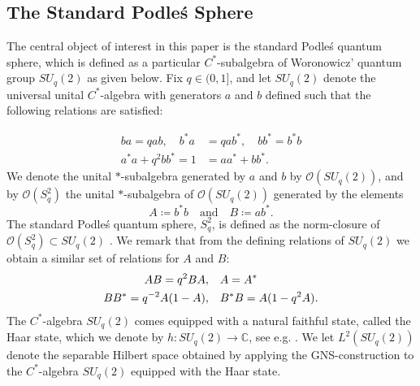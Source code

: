 \documentclass[11pt, reqno, a4paper, final]{amsart}
\theoremstyle{plain}
\theoremstyle{definition}
\newcommand{\ZZ}{{\mathbb Z}}
\newcommand{\CC}{{\mathbb C}}
\newcommand{\black}{\color{black}}
\begin{document}
\subsection{The Standard Podle\'s Sphere}
The central object of interest in this paper is the standard Podle\'s quantum sphere, which is defined as a particular $C^*$-subalgebra of Woronowicz' \cite{Woronowicz-SU2} quantum group $SU_q(2)$ as given below.
Fix {\black $q\in(0,1]$}, and let $SU_q(2)$ denote the universal unital $C^*$-algebra with generators $a$ and $b$ defined such that the following relations are satisfied:

\begin{align*}
ba=qab, \quad b^*a&=qab^*, \quad bb^* =b^*b
\\
a^*a+ q^2bb^* = 1& = aa^*+bb^* .
\end{align*}
We denote the unital $*$-subalgebra generated by $a$ and $b$ by $\mathcal{O}(SU_q(2))$, and
by $\mathcal{O}(S_q^2)$  the unital $*$-subalgebra of $\mathcal{O}(SU_q(2))$ generated by the elements
$$A\coloneqq b^*b \quad \text{and} \quad B\coloneqq ab^*.$$
The standard Podle\'s quantum sphere, $S_q^2$, is defined as the norm-closure of $\mathcal{O}(S^2_q)\subset SU_q(2)$ \cite{Podles}.
We remark that from the defining relations of $SU_q(2)$ we obtain a similar set of relations for $A$ and $B$:
\begin{align*}
AB=q^2BA, &\quad A=A^*
\\
BB^*=q^{-2}A(1-A), &\quad {\black B^*B=A(1-q^2A)}.
\end{align*}
The $C^*$-algebra $SU_q(2)$ comes equipped with a natural faithful state, called the Haar state, which we denote by {\black $h : SU_q(2) \to \CC$}, see e.g. \cite[Section 11.3.2]{Klimyk}. {\black We let $L^2(SU_q(2))$ denote the separable Hilbert space obtained by applying the GNS-construction to the $C^*$-algebra $SU_q(2)$ equipped with the Haar state.}
\end{document}
